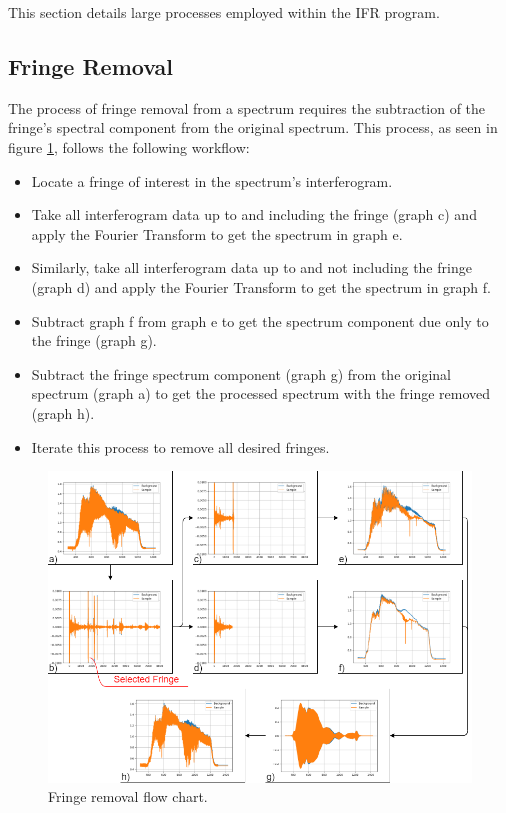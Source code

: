 \documentclass[a4paper, 12pt]{report}
\begin{document}
    This section details large processes employed within the IFR program.
    
    \subsection{Fringe Removal}\label{fringe_removal}
    
    The process of fringe removal from a spectrum requires the subtraction of the fringe's spectral component from the original spectrum. This process, as seen in figure \ref{fig:7}, follows the following workflow:
    
    \begin{itemize}
        \item Locate a fringe of interest in the spectrum's interferogram.
        \item Take all interferogram data up to and including the fringe (graph c) and apply the Fourier Transform to get the spectrum in graph e.
        \item Similarly, take all interferogram data up to and not including the fringe (graph d) and apply the Fourier Transform to get the spectrum in graph f.
        \item Subtract graph f from graph e to get the spectrum component due only to the fringe (graph g).
        \item Subtract the fringe spectrum component (graph g) from the original spectrum (graph a) to get the processed spectrum with the fringe removed (graph h).
        \item Iterate this process to remove all desired fringes.
    \end{itemize}
    
    \begin{figure}[h]
        \centering
        \includegraphics[width=\textwidth]{figures/poster_flow_chart_v3.png}
        \caption{Fringe removal flow chart.}
        \label{fig:7}
    \end{figure}
    
\end{document}
